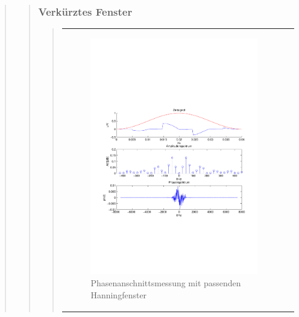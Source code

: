 \begin{quote}
\begin{quote}
        \subsubsection{Verkürztes Fenster }
		\begin{quote}        
                \begin{center}
                \begin{tabular}{ll}
    
                \hspace{-11em}
                    \begin{minipage}{0.6\textwidth}
    
                        \begin{figure}[H]
                            \label{fig:}
                            \includegraphics[scale=0.4, trim = 1.5cm 7cm 1.5cm 8cm,
                            clip]{./Bilder/Phasenanschnittsmessungmithanningfenster} %
                            \caption{Phasenanschnittsmessung mit passenden Hanningfenster}
                        \end{figure}
    

\end{minipage}
\end{tabular}
\end{center}
\end{quote}
\end{quote}
\end{quote}
